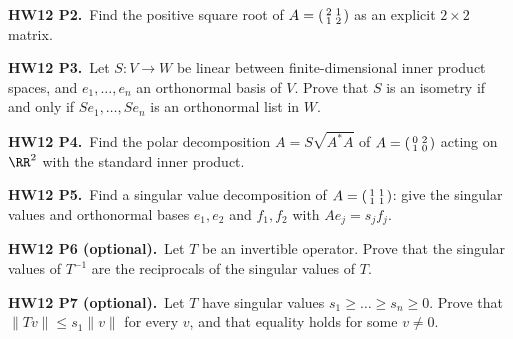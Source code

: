 \documentclass[10pt]{scrartcl}
\begin{document}
\begin{prob}
  \textbf{HW12 P2.}\ Find the positive square root of $A=\begin{psmallmatrix}2&1\\1&2\end{psmallmatrix}$ as an explicit $2\times2$ matrix.

\end{prob}

\begin{prob}
  \textbf{HW12 P3.}\ Let $S\colon V\to W$ be linear between finite-dimensional inner product spaces, and $e_1,\dots,e_n$ an orthonormal basis of $V$. Prove that $S$ is an isometry if and only if $Se_1,\dots,Se_n$ is an orthonormal list in $W$.

\end{prob}

\begin{prob}
  \textbf{HW12 P4.}\ Find the polar decomposition $A=S\sqrt{A^*A}$ of $A=\begin{psmallmatrix}0&2\\1&0\end{psmallmatrix}$ acting on $\RR^2$ with the standard inner product.

\end{prob}

\begin{prob}
  \textbf{HW12 P5.}\ Find a singular value decomposition of $A=\begin{psmallmatrix}1&1\\1&1\end{psmallmatrix}$: give the singular values and orthonormal bases $e_1,e_2$ and $f_1,f_2$ with $Ae_j=s_jf_j$.

\end{prob}

\begin{prob}
  \textbf{HW12 P6 (optional).}\ Let $T$ be an invertible operator. Prove that the singular values of $T^{-1}$ are the reciprocals of the singular values of $T$.

\end{prob}

\begin{prob}
  \textbf{HW12 P7 (optional).}\ Let $T$ have singular values $s_1\ge\dots\ge s_n\ge0$. Prove that $\|Tv\|\le s_1\|v\|$ for every $v$, and that equality holds for some $v\neq0$.

\end{prob}
\end{document}
